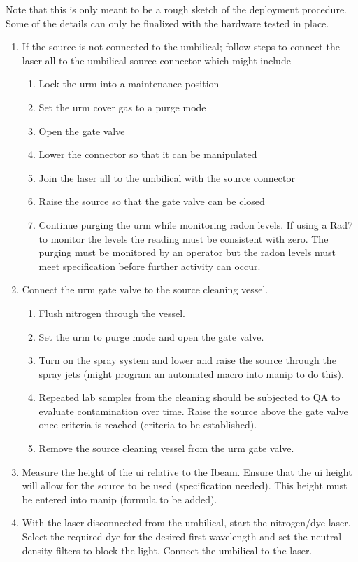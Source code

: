Note that this is only meant to be a rough sketch of the deployment procedure. Some of the details can only be finalized with the hardware tested in place. 
\begin{enumerate}
\item If the source is not connected to the umbilical; follow steps to connect the laser all to the umbilical source connector which might include
	\begin{enumerate}
  \item Lock the urm into a maintenance position 
	\item Set the urm cover gas to a purge mode
	\item Open the gate valve 
	\item Lower the connector so that it can be manipulated 
	\item Join the laser all to the umbilical with the source connector
	\item Raise the source so that the gate valve can be closed
	\item Continue purging the urm while monitoring radon levels. If using a Rad7 to monitor the levels the reading must be consistent with zero. The purging must be monitored by an operator but the radon levels must meet specification before further activity can occur. 
  \end{enumerate}
\item Connect the urm gate valve to the source cleaning vessel. 
	\begin{enumerate}
  \item Flush nitrogen through the vessel.
	\item Set the urm to purge mode and open the gate valve.
	\item Turn on the spray system and lower and raise the source through the spray jets (might program an automated macro into manip to do this).
	\item Repeated lab samples from the cleaning should be subjected to QA to evaluate contamination over time. Raise the source above the gate valve once criteria is reached (criteria to be established).  
	\item Remove the source cleaning vessel from the urm gate valve. 
  \end{enumerate}
\item Measure the height of the ui relative to the Ibeam. Ensure that the ui height will allow for the source to be used (specification needed). This height must be entered into manip (formula to be added). 
\item With the laser disconnected from the umbilical, start the nitrogen/dye laser. Select the required dye for the desired first wavelength and set the neutral density filters to block the light. Connect the umbilical to the laser. 

\end{enumerate}
